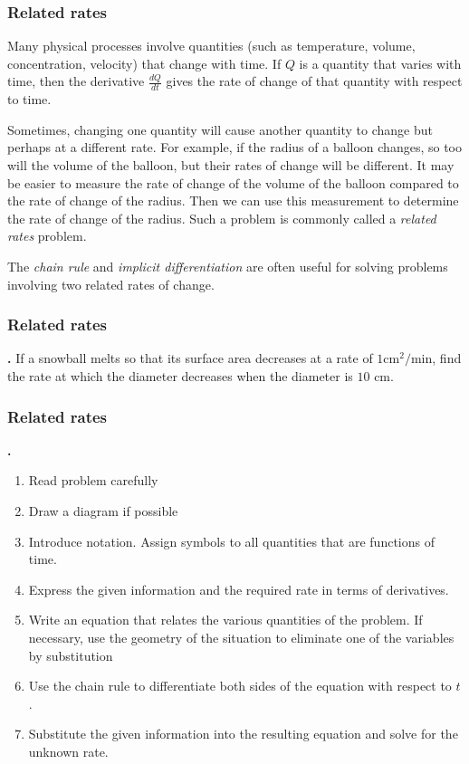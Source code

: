 \documentclass[t]{beamer}
\theoremstyle{plain}
\theoremstyle{definition}
\newcounter{heading}
\newcommand{\newhead}[1]{\medskip\stepcounter{heading}\noindent\textbf{\hspace{0.2cm}{#1}.}}
\begin{document}
\begin{frame}
\frametitle{Related rates}

\noindent Many physical processes involve quantities (such as temperature, volume, concentration, velocity) that change with time.  If $Q$ is a quantity that varies with time, then the derivative $\frac{dQ}{dt}$ gives the rate of change of that quantity with respect to time.\pause

\smallskip

\noindent Sometimes, changing one quantity will cause another quantity to change but perhaps at a different rate. For example, if the radius of a balloon changes, so too will the volume of the balloon, but their rates of change will be different.  It may be easier to measure the rate of change of the volume of the balloon compared to the rate of change of the radius.  Then we can use this measurement to determine the rate of change of the radius.  Such a problem is commonly called a \emph{related rates} problem.\pause

\smallskip

\noindent 
The \textit{chain rule} and \textit{implicit differentiation} are often useful for solving problems involving two related rates of change.

\end{frame}

\begin{frame}
\frametitle{Related rates}

\newhead{Example (Stewart, Problem 2.7.9)} If a snowball melts so that its surface area decreases at a rate of $1\mathrm{ cm}^{2}/\mathrm{min}$, find the rate at which the diameter decreases when the diameter is $10$ cm.

\end{frame}

\begin{frame}
\frametitle{Related rates}

\newhead{Strategy for solving related rates problems (Stewart, p.129)}
\begin{enumerate}[<+->]
\item Read problem carefully 
\item Draw a diagram if possible
\item Introduce notation.  Assign symbols to all quantities that are functions of time.
\item Express the given information and the required rate in terms of derivatives.
\item Write an equation that relates the various quantities of the problem.  If necessary, use the geometry of the situation to eliminate one of the variables by substitution
\item Use the chain rule to differentiate both sides of the equation with respect to $t$.
\item Substitute the given information into the resulting equation and solve for the unknown rate.
\end{enumerate}

\end{frame}
\end{document}
